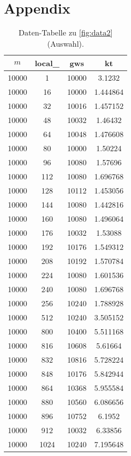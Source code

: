 \documentclass[
ngerman,
subtask=ruled %
]{tudaexercise}
\begin{document}
	\section{Appendix}
	\begin{table}[H]
		\centering
		\begin{tabular}{|c|c|c|c|}
			\hline
			$m$ & local\_ & \textbf{gws} & \textbf{kt} \\
			\hline
			10000 & 1 & 10000 & 3.1232 \\
			10000 & 16 & 10000 & 1.444864 \\
			10000 & 32 & 10016 & 1.457152 \\
			10000 & 48 & 10032 & 1.46432 \\
			10000 & 64 & 10048 & 1.476608 \\
			10000 & 80 & 10000 & 1.50224 \\
			10000 & 96 & 10080 & 1.57696 \\
			10000 & 112 & 10080 & 1.696768 \\
			10000 & 128 & 10112 & 1.453056 \\
			10000 & 144 & 10080 & 1.442816 \\
			10000 & 160 & 10080 & 1.496064 \\
			10000 & 176 & 10032 & 1.53088 \\
			10000 & 192 & 10176 & 1.549312 \\
			10000 & 208 & 10192 & 1.570784 \\
			10000 & 224 & 10080 & 1.601536 \\
			10000 & 240 & 10080 & 1.696768 \\
			10000 & 256 & 10240 & 1.788928 \\
			10000 & 512 & 10240 & 3.505152 \\
			10000 & 800 & 10400 & 5.511168 \\
			10000 & 816 & 10608 & 5.61664 \\
			10000 & 832 & 10816 & 5.728224 \\
			10000 & 848 & 10176 & 5.842944 \\
			10000 & 864 & 10368 & 5.955584 \\
			10000 & 880 & 10560 & 6.086656 \\
			10000 & 896 & 10752 & 6.1952 \\
			10000 & 912 & 10032 & 6.33856 \\
			10000 & 1024 & 10240 & 7.195648 \\
			\hline
		\end{tabular}
		\caption{Daten-Tabelle zu \ref{fig:data2} (Auswahl).}
		\label{tab:data2}
	\end{table}

	
	
\end{document}
